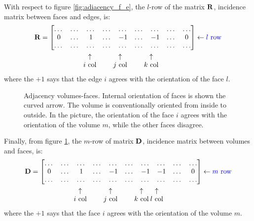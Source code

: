 With respect to figure \ref{fig:adiacency_f_e}, the $l$-row of the
matrix $\mathbf{R}$, incidence matrix between faces and edges, is:
\begin{align*}
  \Matrix{R} & = \begin{bmatrix}
    \dots & \dots & \dots  & \dots & \dots & \dots & \dots & \dots    & \dots \\
    0     & \dots & 1      & \dots & -1    & \dots & -1    & \dots    & 0     \\
    \dots & \dots & \dots  & \dots & \dots & \dots & \dots & \dots    & \dots
  \end{bmatrix} \leftarrow \text{\color[rgb]{0,0,1}$l$ row} \\
  & \quad \begin{matrix}
    \qquad & \qquad & \mspace{-14mu}\uparrow       & \qquad & \mspace{-28mu}\uparrow       & \qquad & \mspace{-28mu}\uparrow \\
    \qquad & \qquad & \mspace{-14mu}\text{$i$ col} & \qquad & \mspace{-28mu}\text{$j$ col} & \qquad & \mspace{-28mu}\text{$k$ col}
  \end{matrix}
\end{align*}
where the $+1$ says that the edge $i$ agrees with the orientation of
the face $l$.

\begin{figure}[htbp]
  \begin{center}
    \resizebox{4cm}{!}{}
  \end{center}
  \caption{Adjacency volumes-faces. Internal orientation of faces is
    shown the curved arrow. The volume is conventionally oriented from
    inside to outside. In the picture, the orientation of the face $i$
    agrees with the orientation of the volume $m$, while the other faces
    disagree.}
  \label{fig:adiacency_v_f}
\end{figure}

Finally, from figure \ref{fig:adiacency_v_f}, the $m$-row of matrix
$\mathbf{D}$, incidence matrix between volumes and faces, is:
\begin{align*}
  \Matrix{D} & = \begin{bmatrix}
    \dots & \dots & \dots  & \dots & \dots & \dots & \dots & \dots & \dots    & \dots \\
    0     & \dots & 1      & \dots & -1    & \dots & -1    & -1    & \dots    & 0     \\
    \dots & \dots & \dots  & \dots & \dots & \dots & \dots & \dots & \dots    & \dots
  \end{bmatrix} \leftarrow \text{\color[rgb]{0,0,1}$m$ row} \\
  & \quad \begin{matrix}
    \qquad & \qquad & \mspace{-14mu}\uparrow       & \qquad & \mspace{-28mu}\uparrow       & \qquad & \mspace{-28mu}\uparrow       & \mspace{-14mu}\uparrow \\
    \qquad & \qquad & \mspace{-14mu}\text{$i$ col} & \qquad & \mspace{-28mu}\text{$j$ col} & \qquad & \mspace{-28mu}\text{$k$ col} & \mspace{-14mu}\text{$l$ col}
  \end{matrix}
\end{align*}
where the $+1$ says that the face $i$ agrees with the orientation of
the volume $m$.

